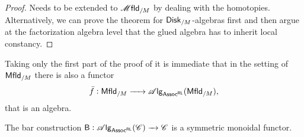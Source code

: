 \documentclass[../text]{subfiles}
\begin{document}
\begin{proof}
    {\color{red}Needs to be extended to $\mfld_{/M}$ by dealing with the homotopies. Alternatively, we can prove the theorem for $\disk[r]_{/M}$-algebras first and then argue at the factorization algebra level that the glued algebra has to inherit local constancy.}
\end{proof}

\begin{corollary}\label{cor:fbar_func_discrete}
    Taking only the first part of the proof of  it is immediate that in the setting of $\mfld[r]_{/M}$ there is also a functor
    \begin{equation}
        \bar{f}: \mfld[r]_{/M} \xrightarrow{\ \ \ \ } \alg{\mathsf{Assoc^{RL}}} (\mfld[r]_{/M}),
    \end{equation}
    that is an algebra.
\end{corollary}

\begin{lemma}\label{lem:B_sym_mon}
    The bar construction $\mathsf{B}: \mathscr{A} \mathsf{lg}_{\mathsf{Assoc^{RL}}} (\mathscr{C}) \xrightarrow{\ \ } \mathscr{C}$ is a symmetric monoidal functor.
\end{lemma}
\end{document}
